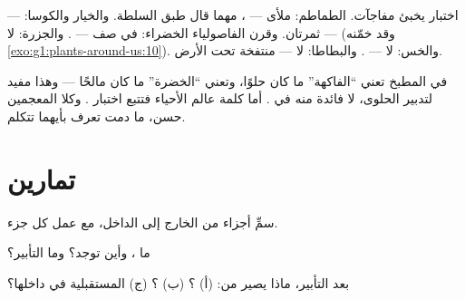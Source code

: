 \begin{example}\label{ex:g3:flowers-fruits-seeds:surprise}
اختبار  يخبئ مفاجآت. الطماطم: ملأى  --- ، مهما
قال طبق السلطة. والخيار والكوسا:  --- ثمرتان. وقرن الفاصولياء
الخضراء:  في صف --- . والجزرة: لا  ---
 (وقد خمّنه \cref{exo:g1:plants-around-us:10}). والخس: لا
 --- . والبطاطا: لا  ---  منتفخة تحت الأرض.
\end{example}

\begin{remark}\label{rem:g3:flowers-fruits-seeds:words}
في المطبخ تعني ``الفاكهة'' ما كان حلوًا، وتعني ``الخضرة'' ما كان
مالحًا --- وهذا مفيد لتدبير الحلوى، لا فائدة منه في .
أما كلمة عالم الأحياء فتتبع اختبار . وكلا المعجمين حسن، ما
دمت تعرف بأيهما تتكلم.
\end{remark}

\section{تمارين}

\begin{exercise}[$\star$]\label{exo:g3:flowers-fruits-seeds:1}
سمِّ أجزاء  من الخارج إلى الداخل، مع عمل كل جزء.
\end{exercise}

\begin{exercise}[$\star$]\label{exo:g3:flowers-fruits-seeds:2}
ما ، وأين توجد؟ وما التأبير؟
\end{exercise}

\begin{exercise}[$\star$]\label{exo:g3:flowers-fruits-seeds:3}
بعد التأبير، ماذا يصير من: (أ) ؟ (ب) ؟ (ج) 
المستقبلية في داخلها؟
\end{exercise}

